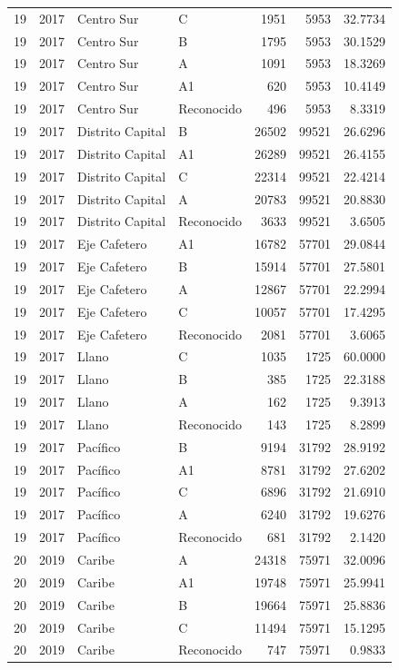 \documentclass[12pt,letterpaper]{article}
\begin{document}
\begin{longtable}{rrllrrr}
19 & 2017 & Centro Sur & C & 1951 & 5953 & 32.7734 \\
19 & 2017 & Centro Sur & B & 1795 & 5953 & 30.1529 \\
19 & 2017 & Centro Sur & A & 1091 & 5953 & 18.3269 \\
19 & 2017 & Centro Sur & A1 & 620 & 5953 & 10.4149 \\
19 & 2017 & Centro Sur & Reconocido & 496 & 5953 & 8.3319 \\

19 & 2017 & Distrito Capital & B & 26502 & 99521 & 26.6296 \\
19 & 2017 & Distrito Capital & A1 & 26289 & 99521 & 26.4155 \\
19 & 2017 & Distrito Capital & C & 22314 & 99521 & 22.4214 \\
19 & 2017 & Distrito Capital & A & 20783 & 99521 & 20.8830 \\
19 & 2017 & Distrito Capital & Reconocido & 3633 & 99521 & 3.6505 \\

19 & 2017 & Eje Cafetero & A1 & 16782 & 57701 & 29.0844 \\
19 & 2017 & Eje Cafetero & B & 15914 & 57701 & 27.5801 \\
19 & 2017 & Eje Cafetero & A & 12867 & 57701 & 22.2994 \\
19 & 2017 & Eje Cafetero & C & 10057 & 57701 & 17.4295 \\
19 & 2017 & Eje Cafetero & Reconocido & 2081 & 57701 & 3.6065 \\

19 & 2017 & Llano & C & 1035 & 1725 & 60.0000 \\
19 & 2017 & Llano & B & 385 & 1725 & 22.3188 \\
19 & 2017 & Llano & A & 162 & 1725 & 9.3913 \\
19 & 2017 & Llano & Reconocido & 143 & 1725 & 8.2899 \\

19 & 2017 & Pacífico & B & 9194 & 31792 & 28.9192 \\
19 & 2017 & Pacífico & A1 & 8781 & 31792 & 27.6202 \\
19 & 2017 & Pacífico & C & 6896 & 31792 & 21.6910 \\
19 & 2017 & Pacífico & A & 6240 & 31792 & 19.6276 \\
19 & 2017 & Pacífico & Reconocido & 681 & 31792 & 2.1420 \\

20 & 2019 & Caribe & A & 24318 & 75971 & 32.0096 \\
20 & 2019 & Caribe & A1 & 19748 & 75971 & 25.9941 \\
20 & 2019 & Caribe & B & 19664 & 75971 & 25.8836 \\
20 & 2019 & Caribe & C & 11494 & 75971 & 15.1295 \\
20 & 2019 & Caribe & Reconocido & 747 & 75971 & 0.9833 \\


\end{longtable}
\end{document}
